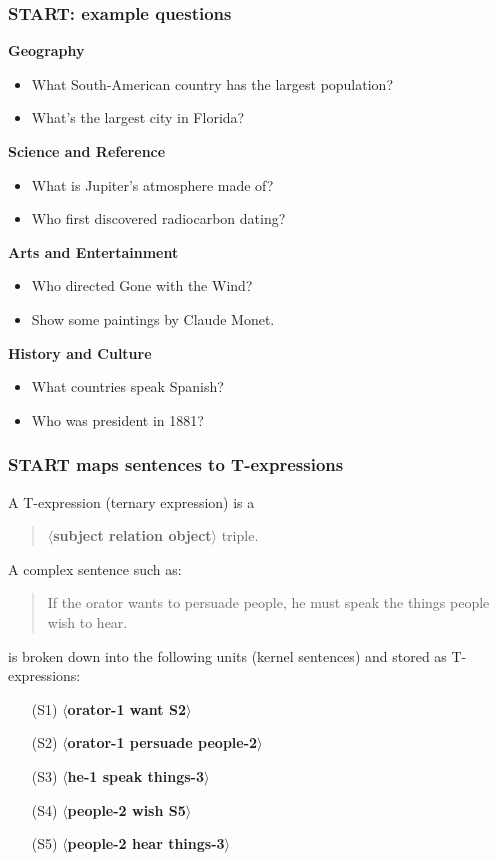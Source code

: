 \documentclass[ignorenonframetext]{beamer}
\begin{document}
\begin{frame}\frametitle{START: example questions}
{\bf Geography}\begin{itemize}
\item What South-American country has the largest population?
\item What's the largest city in Florida?
\end{itemize}

{\bf Science and Reference}\begin{itemize}
\item What is Jupiter's atmosphere made of?
\item Who first discovered radiocarbon dating?
\end{itemize}

{\bf Arts and Entertainment}\begin{itemize}
\item Who directed Gone with the Wind?
\item Show some paintings by Claude Monet.
\end{itemize}

{\bf History and Culture}\begin{itemize}
\item What countries speak Spanish?
\item Who was president in 1881?
\end{itemize}
\end{frame}

\begin{frame}\frametitle{START maps sentences to T-expressions}
A T-expression (ternary expression) is a 
\begin{quote}
$\langle${\bf subject relation object}$\rangle$ triple.
\end{quote}
A complex sentence such as:
\begin{quote}
If the orator wants to persuade people, he must speak the things
people wish to hear.
\end{quote}
is broken down into the following units (kernel sentences) and stored as T-expressions:
\begin{itemize}
\item[(S1)] $\langle${\bf orator-1 want S2}$\rangle$
\item[(S2)] $\langle${\bf orator-1 persuade people-2}$\rangle$
\item[(S3)] $\langle${\bf he-1 speak things-3}$\rangle$
\item[(S4)] $\langle${\bf people-2 wish S5}$\rangle$
\item[(S5)] $\langle${\bf people-2 hear things-3}$\rangle$
\end{itemize}
\end{frame}
\end{document}
